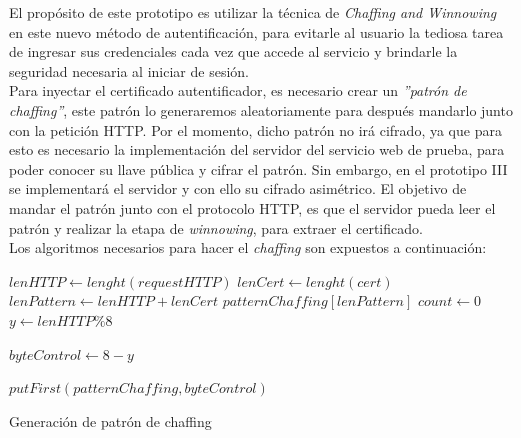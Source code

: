 \documentclass[12pt, a4paper, titlepage]{report}
\begin{document}
		    El propósito de este prototipo es utilizar la técnica de \textit{Chaffing and Winnowing} en este nuevo método de autentificación, para evitarle al usuario la tediosa tarea de ingresar sus credenciales cada vez que accede al servicio y brindarle la seguridad necesaria al iniciar de sesión.\\
		    
		    Para inyectar el certificado autentificador, es necesario crear un \textit{''patrón de chaffing''}, este patrón lo generaremos aleatoriamente para después mandarlo junto con la petición HTTP. Por el momento, dicho patrón no irá cifrado, ya que para esto es necesario la implementación del servidor del servicio web de prueba, para poder conocer su llave pública y cifrar el patrón. Sin embargo, en el prototipo III se implementará el servidor y con ello su cifrado asimétrico. El objetivo de mandar el patrón junto con el protocolo HTTP, es que el servidor pueda leer el patrón y realizar la etapa de \textit{winnowing}, para extraer el certificado.\\
            
            Los algoritmos necesarios para hacer el \textit{chaffing} son expuestos a continuación:\\
            
            \begin{algorithm}[H]
                \SetAlgoLined
                
                $lenHTTP \longleftarrow lenght(requestHTTP)$\;
                $lenCert \longleftarrow lenght(cert)$\;
                $lenPattern \longleftarrow lenHTTP + lenCert$\;
                $patternChaffing[lenPattern]$\;
                $count \longleftarrow 0$\;
                $y \longleftarrow lenHTTP \% 8$\;
                
                $byteControl \longleftarrow 8-y$\;
                
                $putFirst(patternChaffing, byteControl)$\;
                \caption{Generación de patrón de chaffing}
            \end{algorithm}
            
\end{document}
